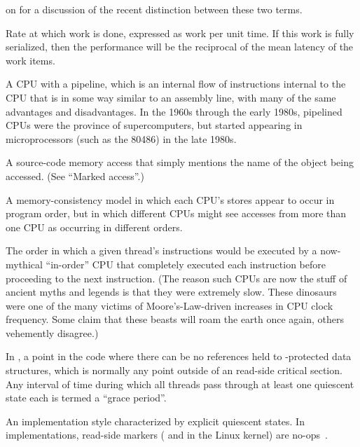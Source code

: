 \begin{description}
	on 
	for a discussion of the recent distinction between these two
	terms.
\item[\IXG{Performance}:]
	Rate at which work is done, expressed as work per unit time.
	If this work is fully serialized, then the performance will
	be the reciprocal of the mean latency of the work items.
\item[\IXGr{Pipelined CPU}:]
	A CPU with a pipeline, which is
	an internal flow of instructions internal to the CPU that
	is in some way similar to an assembly line, with many of
	the same advantages and disadvantages.
	In the 1960s through the early 1980s, pipelined CPUs were the
	province of supercomputers, but started appearing in microprocessors
	(such as the 80486) in the late 1980s.
\item[\IXG{Plain Access}:]
	A source-code memory access that simply mentions the name of
	the object being accessed.
	(See ``Marked access''.)
\item[\IXGalth{Process Consistency}{process}{memory consistency}:]
	A memory-consistency model in which each CPU's stores appear to
	occur in program order, but in which different CPUs might see
	accesses from more than one CPU as occurring in different orders.
\item[\IXG{Program Order}:]
	The order in which a given thread's instructions
	would be executed by a now-mythical ``in-order'' CPU that
	completely executed each instruction before proceeding to
	the next instruction.
	(The reason such CPUs are now the stuff of ancient myths
	and legends is that they were extremely slow.
	These dinosaurs were one of the many victims of
	Moore's-Law-driven increases in CPU clock frequency.
	Some claim that these beasts will roam the earth once again,
	others vehemently disagree.)
\item[\IXG{Quiescent State}:]
	In , a point in the code where there can be no references held
	to -protected data structures, which is normally any point
	outside of an  read-side critical section.
	Any interval of time during which all threads pass through at
	least one quiescent state each is termed a ``grace period''.
\item[Quiescent-State-Based Reclamation (QSBR):]
	An  implementation style characterized by explicit quiescent
	states.
	In  implementations, read-side markers
	( and  in the Linux
	kernel) are no-ops~\cite{McKenney98,Slingwine95}.

\end{description}
